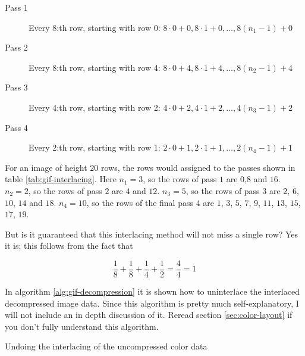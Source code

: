 \newcommand{\passrows}[3]{$#1 \cdot 0 + #2, #1 \cdot 1 + #2, \dots,
  #1(n_{#3}-1) + #2$}

\begin{description}
\item[Pass 1] Every 8:th row, starting with row 0: \passrows{8}{0}{1}
\item[Pass 2] Every 8:th row, starting with row 4: \passrows{8}{4}{2}
\item[Pass 3] Every 4:th row, starting with row 2: \passrows{4}{2}{3}
\item[Pass 4] Every 2:th row, starting with row 1: \passrows{2}{1}{4}
\end{description}

For an image of height $20$ rows, the rows would assigned to the
passes shown in table \ref{tab:gif-interlacing}. Here $n_1 =
3$, so the rows of pass $1$ are $0$,$8$ and $16$. $n_2 = 2$, so the
rows of pass $2$ are $4$ and $12$. $n_3 = 5$, so the rows of pass $3$
are $2$, $6$, $10$, $14$ and $18$. $n_4 = 10$, so the rows of the
final pass $4$ are $1$, $3$, $5$, $7$, $9$, $11$, $13$, $15$, $17$,
$19$.

But is it guaranteed that this interlacing method will not miss a single
row? Yes it is; this follows from the fact that

\begin{equation*}
  \frac{1}{8} + \frac{1}{8} + \frac{1}{4} + \frac{1}{2} = \frac{4}{4}
  = 1
\end{equation*}

In algorithm \ref{alg:gif-decompression} it is shown how to
uninterlace the interlaced decompressed image data.  Since this
algorithm is pretty much self-explanatory, I will not include an in
depth discussion of it. Reread section \ref{sec:color-layout} if you
don't fully understand this algorithm.

\begin{algorithm}[H]
  \caption{Undoing the interlacing of the uncompressed \gif color data}
  \label{alg:gif-interlace}
  \begin{algorithmic}[1]






    \EndForTo


    \EndWhile

    \EndForTo

  \end{algorithmic}
\end{algorithm}

